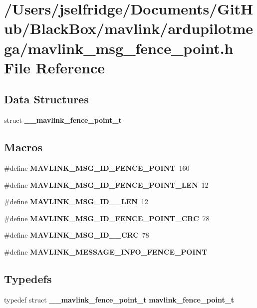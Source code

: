 \section{/\+Users/jselfridge/\+Documents/\+Git\+Hub/\+Black\+Box/mavlink/ardupilotmega/mavlink\+\_\+msg\+\_\+fence\+\_\+point.h File Reference}
\label{mavlink__msg__fence__point_8h}
\subsection*{Data Structures}
\begin{DoxyCompactItemize}
\item 
struct \textbf{ \+\_\+\+\_\+mavlink\+\_\+fence\+\_\+point\+\_\+t}
\end{DoxyCompactItemize}
\subsection*{Macros}
\begin{DoxyCompactItemize}
\item 
\#define \textbf{ M\+A\+V\+L\+I\+N\+K\+\_\+\+M\+S\+G\+\_\+\+I\+D\+\_\+\+F\+E\+N\+C\+E\+\_\+\+P\+O\+I\+NT}~160
\item 
\#define \textbf{ M\+A\+V\+L\+I\+N\+K\+\_\+\+M\+S\+G\+\_\+\+I\+D\+\_\+\+F\+E\+N\+C\+E\+\_\+\+P\+O\+I\+N\+T\+\_\+\+L\+EN}~12
\item 
\#define \textbf{ M\+A\+V\+L\+I\+N\+K\+\_\+\+M\+S\+G\+\_\+\+I\+D\+\_\+\_\+\+L\+EN}~12
\item 
\#define \textbf{ M\+A\+V\+L\+I\+N\+K\+\_\+\+M\+S\+G\+\_\+\+I\+D\+\_\+\+F\+E\+N\+C\+E\+\_\+\+P\+O\+I\+N\+T\+\_\+\+C\+RC}~78
\item 
\#define \textbf{ M\+A\+V\+L\+I\+N\+K\+\_\+\+M\+S\+G\+\_\+\+I\+D\+\_\+\_\+\+C\+RC}~78
\item 
\#define \textbf{ M\+A\+V\+L\+I\+N\+K\+\_\+\+M\+E\+S\+S\+A\+G\+E\+\_\+\+I\+N\+F\+O\+\_\+\+F\+E\+N\+C\+E\+\_\+\+P\+O\+I\+NT}
\end{DoxyCompactItemize}
\subsection*{Typedefs}
\begin{DoxyCompactItemize}
\item 
typedef struct \textbf{ \+\_\+\+\_\+mavlink\+\_\+fence\+\_\+point\+\_\+t} \textbf{ mavlink\+\_\+fence\+\_\+point\+\_\+t}
\end{DoxyCompactItemize}


